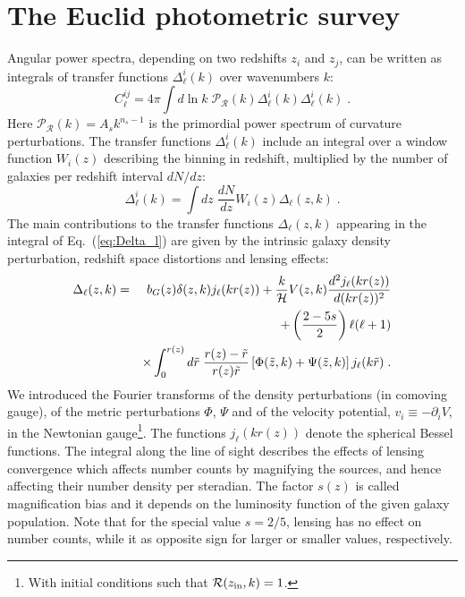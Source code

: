 \chapter{The Euclid photometric survey}
\label{appendix1-mnu}

Angular power spectra, depending on two redshifts $z_i$ and $z_j$, can be written as integrals of transfer functions $\Delta_{\ell}^i(k)$ over wavenumbers $k$:
\begin{equation} \label{eq:Cl}
C_{\ell}^{ij} = 4\pi \int d\ln k\; \mathcal{P}_{\mathcal{R}}(k) \Delta_{\ell}^{i}(k) \Delta_{\ell}^{i}(k) \;.
\end{equation}
Here $\mathcal{P}_{\mathcal{R}}(k)=A_s k^{n_s-1}$ is the primordial power spectrum of curvature perturbations.
The transfer functions $\Delta_{\ell}^i(k)$ include an integral over a window function $W_i(z)$ describing the binning in redshift, multiplied by the number of galaxies per redshift interval $dN/dz$:
\begin{equation} \label{eq:Delta_l}
  \Delta_{\ell}^i(k) = \int dz\; \frac{dN}{dz} W_i(z) \Delta_{\ell}(z,k) \;.
\end{equation}
%
The main contributions to the transfer functions $\Delta_{\ell}(z,k)$ appearing in the integral of Eq.~(\ref{eq:Delta_l}) are given by the intrinsic galaxy density perturbation, redshift space distortions and lensing effects:
\begin{eqnarray}
  \Delta_{\ell}(z,k) &=& b_G(z) \delta(z,k) j_\ell(kr(z))
  + \frac{k}{\cal H} V(z,k) \frac{d^2 j_\ell(kr(z))}{d(kr(z))^2}
  \nonumber \\
  &&+ \left( \frac{2-5s}{2}\right) \ell(\ell+1)
  \nonumber \\
  &&\times \int_0^{r(z)} d\tilde r\; \frac{r(z)-{\tilde r}}{r(z) {\tilde r}} \left[ {\Phi}(\tilde z,k) + {\Psi}(\tilde z,k) \right] j_\ell(k{\tilde r}) \;.
  \nonumber \\
\end{eqnarray}
We introduced the Fourier transforms of the density perturbations (in comoving gauge), of the metric perturbations $\Phi$, $\Psi$ and of the velocity potential, $v_i\equiv-\partial_i V$, in the Newtonian gauge\footnote{With initial conditions such that ${\cal R}(z_{\rm{in}},k)=1$.}.
The functions $j_\ell(kr(z))$ denote the spherical Bessel functions.
The integral along the line of sight describes the effects of lensing convergence which affects number counts by magnifying the sources, and hence affecting their number density per steradian.
The factor $s(z)$ is called magnification bias and it depends on the luminosity function of the given galaxy population.
Note that for the special value $s=2/5$, lensing has no effect on number counts, while it as opposite sign for larger or smaller values, respectively.


